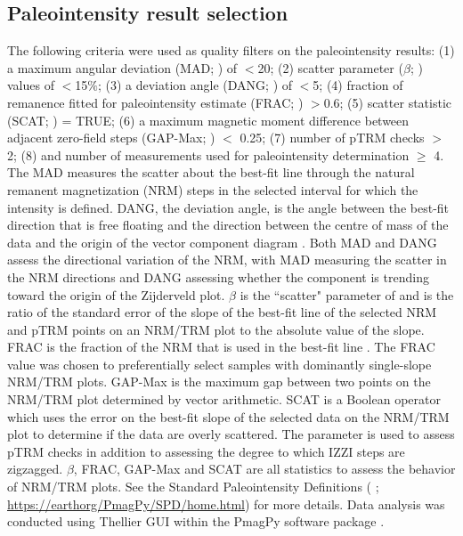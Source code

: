\documentclass[9pt,twocolumn,twoside,lineno]{pnas-new}
\begin{document}
{%

\subsection*{Paleointensity result selection}
The following criteria were used as quality filters on the paleointensity results: (1) a maximum angular deviation (MAD;  \citealp{Kirschvink1980a}) of $<$20\textdegree; (2) scatter parameter ($\beta$;  \citealp{Coe1978a}) values of $<$15$\%$; (3) a deviation angle (DANG;  \citealp{Tauxe2004a}) of $<$5\textdegree; (4) fraction of remanence fitted for paleointensity estimate (FRAC;  \cite{Shaar2013a}) $>$0.6; (5) scatter statistic (SCAT;  \citealp{Shaar2013a}) = TRUE; (6) a maximum magnetic moment difference between adjacent zero-field steps (GAP-Max;  \citealp{Shaar2013a}) $<$ 0.25; (7) number of pTRM checks $>$ 2; (8) and number of measurements used for paleointensity determination $\geq$ 4. The MAD measures the scatter about the best-fit line through the natural remanent magnetization (NRM) steps in the selected interval for which the intensity is defined. DANG, the deviation angle, is the angle between the best-fit direction that is free floating and the direction between the centre of mass of the data and the origin of the vector component diagram \cite{Tauxe2004a}. Both MAD and DANG assess the directional variation of the NRM, with MAD measuring the scatter in the NRM directions and DANG assessing whether the component is trending toward the origin of the Zijderveld plot. $\beta$ is the ``scatter" parameter of  \cite{Coe1978a} and is the ratio of the standard error of the slope of the best-fit line of the selected NRM and pTRM points on an NRM/TRM plot to the absolute value of the slope. FRAC is the fraction of the NRM that is used in the best-fit line \cite{Shaar2013a}. The FRAC value was chosen to preferentially select samples with dominantly single-slope NRM/TRM plots. GAP-Max is the maximum gap between two points on the NRM/TRM plot determined by vector arithmetic. SCAT is a Boolean operator which uses the error on the best-fit slope of the selected data on the NRM/TRM plot to determine if the data are overly scattered. The parameter is used to assess pTRM checks in addition to assessing the degree to which IZZI steps are zigzagged. $\beta$, FRAC, GAP-Max and SCAT are all statistics to assess the behavior of NRM/TRM plots. See the Standard Paleointensity Definitions ( \citealp{Paterson2014a}; \url{https://earthorg/PmagPy/SPD/home.html}) for more details. Data analysis was conducted using Thellier GUI \cite{Shaar2013a} within the PmagPy software package \cite{Tauxe2016a}.

}
\end{document}
